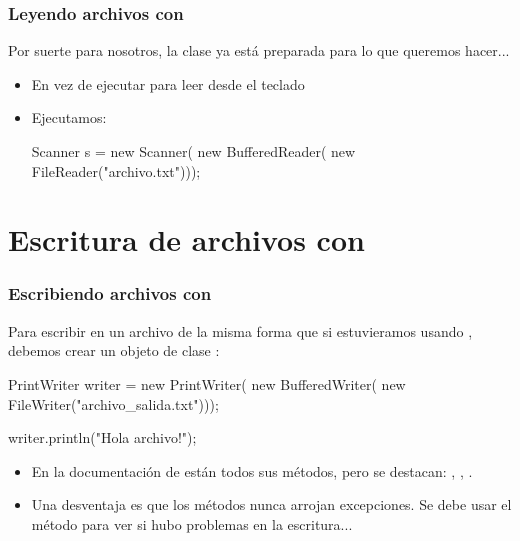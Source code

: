 \documentclass{beamer}
\begin{document}
\begin{frame}[fragile]
  \frametitle{Leyendo archivos con }

  Por suerte para nosotros, la clase  ya está preparada
  para lo que queremos hacer...
  
  \begin{itemize}
  \item En vez de ejecutar  para leer
    desde el teclado
    
  \item Ejecutamos:

    \begin{jsmall}
      Scanner s = new Scanner(
                      new BufferedReader(
                          new FileReader("archivo.txt")));

      \end{jsmall}
    
  \end{itemize}
  
\end{frame}

\section{Escritura de archivos con }

\begin{frame}[fragile]
  \frametitle{Escribiendo archivos con }

  Para escribir en un archivo de la misma forma que si estuvieramos
  usando , debemos crear un objeto de clase
  :

  \begin{jsmall}
    PrintWriter writer = new PrintWriter(
                             new BufferedWriter(
                                 new FileWriter("archivo_salida.txt")));

   writer.println("Hola archivo!");
 \end{jsmall}

 \begin{itemize}[topsep]

 \item En la documentación de  están todos sus
   métodos, pero se destacan: , ,
   .
   
 \item Una desventaja es que los métodos nunca arrojan excepciones. Se
   debe usar el método  para ver si hubo problemas
   en la escritura...
   
 \end{itemize}
   
\end{frame}
\end{document}
